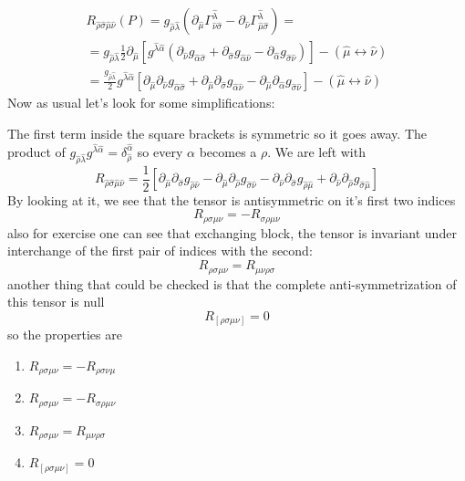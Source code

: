 \begin{gather*}
R_{\hat{\rho }\hat{\sigma }\hat{\mu }\hat{\nu }} \left( P \right) = g_{\hat{\rho }\hat{\lambda }} \left( \partial_{\hat{\mu }} \Gamma ^{\hat{\lambda }}_{\hat{\nu }\hat{\sigma }} - \partial_{\hat{\nu }} \Gamma ^{\hat{\lambda }}_{\hat{\mu }\hat{\sigma }} \right)  = \\
= g_{\hat{\rho }\hat{\lambda }} \frac{1}{2} \partial_{\hat{\mu } } [ g^{\hat{\lambda }\hat{\alpha }} \left( \partial_{\hat{\nu }} g_{\hat{\alpha  }\hat{\sigma }} + \partial_{\hat{\sigma }} g_{\hat{\alpha }\hat{\nu }} - \partial_{\hat{\alpha }} g_{\hat{\sigma }\hat{\nu }} \right) ] - \left( \hat{\mu } \leftrightarrow \hat{\nu } \right) \\
= \frac{g_{\hat{\rho }\hat{\lambda }}}{2} g^{\hat{\lambda }\hat{\alpha }} [ \partial_{\hat{\mu }} \partial_{\hat{\nu }} g_{\hat{\alpha }\hat{\sigma }} + \partial_{\hat{\mu }}\partial_{\hat{\sigma }} g_{\hat{\alpha }\hat{\nu }} - \partial_{\hat{\mu }}\partial_{\hat{\alpha }} g_{\hat{\sigma }\hat{\nu }}] - \left( \hat{\mu } \leftrightarrow \hat{\nu } \right)
\end{gather*} 
Now as usual let's look for some simplifications: \par
The first term inside the square brackets is symmetric so it goes away. The product of $g_{\hat{\rho }\hat{\lambda }} g^{\hat{\lambda }\hat{\alpha }} = \delta ^{\hat{\alpha }}_{\hat{\rho }} $ so every $\alpha $ becomes a $\rho $. We are left with
\begin{equation}
	R_{\hat{\rho }\hat{\sigma }\hat{\mu }\hat{\nu }} = \frac{1}{2} [\partial_{\hat{\mu }}\partial_{\hat{\sigma }} g_{\hat{\rho }\hat{\nu }} - \partial_{\hat{\mu }}\partial_{\hat{\rho }}g_{\hat{\sigma }\hat{\nu }} - \partial_{\hat{\nu }}\partial_{\hat{\sigma }} g_{\hat{\rho }\hat{\mu }}+ \partial_{\hat{\nu }}\partial_{\hat{\rho }}g_{\hat{\sigma }\hat{\mu }}]
\end{equation}
By looking at it, we see that the tensor is antisymmetric on it's first two indices
\[
R_{\rho \sigma \mu \nu } = - R_{\sigma \rho \mu \nu }
\]
also for exercise one can see that exchanging block, the tensor is invariant under interchange of the first pair of indices with the second:
\[
R_{\rho \sigma \mu \nu } = R_{\mu \nu \rho \sigma }
\]
another thing that could be checked is that the complete anti-symmetrization of this tensor is null
\[
	R_{[\rho \sigma \mu \nu ]} = 0
\]
so the properties are
\begin{enumerate}
\item $R_{\rho \sigma \mu \nu }  = - R_{\rho \sigma \nu \mu }$
\item $R_{\rho \sigma \mu \nu } = - R_{\sigma \rho \mu \nu }$
\item $R_{\rho \sigma \mu \nu } = R_{\mu \nu \rho \sigma }$
\item $R_{[\rho \sigma \mu \nu ]} = 0$
\end{enumerate}
